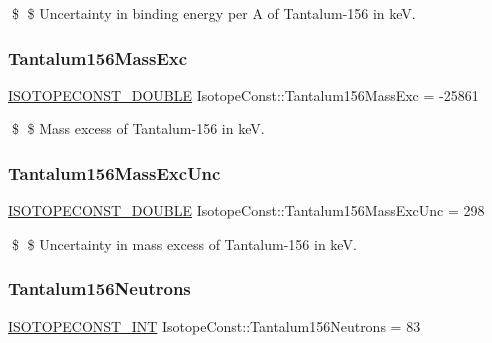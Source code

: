 \$ \$ Uncertainty in binding energy per A of Tantalum-\/156 in keV. \mbox{\label{group___isotope_const-_tantalum-_ta156_ga7ed1a6de8722fe1f77568100dd66b845}} 
\subsubsection{\texorpdfstring{Tantalum156\+Mass\+Exc}{Tantalum156MassExc}}
{\footnotesize\ttfamily \mbox{\hyperlink{group___isotope_const-_macros_ga8f45a7272ce02c0b4c65c44636ed719a}{I\+S\+O\+T\+O\+P\+E\+C\+O\+N\+S\+T\+\_\+\+D\+O\+U\+B\+LE}} Isotope\+Const\+::\+Tantalum156\+Mass\+Exc = -\/25861}

\$ \$ Mass excess of Tantalum-\/156 in keV. \mbox{\label{group___isotope_const-_tantalum-_ta156_ga9446c50076dcc039930c7c24bfbd0648}} 
\subsubsection{\texorpdfstring{Tantalum156\+Mass\+Exc\+Unc}{Tantalum156MassExcUnc}}
{\footnotesize\ttfamily \mbox{\hyperlink{group___isotope_const-_macros_ga8f45a7272ce02c0b4c65c44636ed719a}{I\+S\+O\+T\+O\+P\+E\+C\+O\+N\+S\+T\+\_\+\+D\+O\+U\+B\+LE}} Isotope\+Const\+::\+Tantalum156\+Mass\+Exc\+Unc = 298}

\$ \$ Uncertainty in mass excess of Tantalum-\/156 in keV. \mbox{\label{group___isotope_const-_tantalum-_ta156_gadbae5e019179cb0f07cc3e8d49a1d9f4}} 
\subsubsection{\texorpdfstring{Tantalum156\+Neutrons}{Tantalum156Neutrons}}
{\footnotesize\ttfamily \mbox{\hyperlink{group___isotope_const-_macros_ga5f18360b3e99483a35c32d789e62621c}{I\+S\+O\+T\+O\+P\+E\+C\+O\+N\+S\+T\+\_\+\+I\+NT}} Isotope\+Const\+::\+Tantalum156\+Neutrons = 83}


